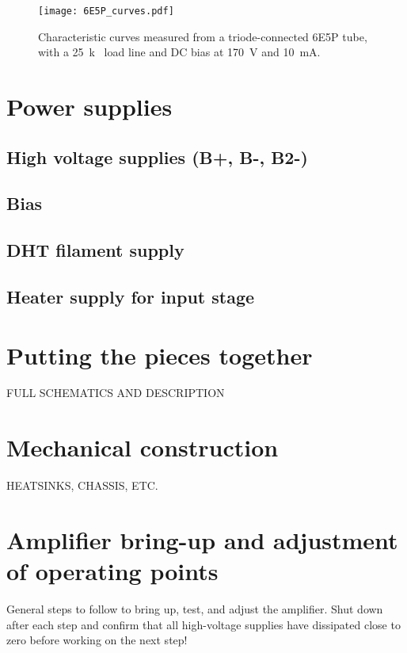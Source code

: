 \begin{figure}
\begin{center}
\texttt{[image: 6E5P\_curves.pdf]}
\caption{Characteristic curves measured from a triode-connected 6E5P tube, with a \SI{25}{k\Ohm} load line and DC bias at \SI{170}{V} and \SI{10}{mA}.}
\end{center}
\end{figure}


\section{Power supplies}

\subsection{High voltage supplies (B+, B-, B2-)}

\subsection{Bias}

\subsection{DHT filament supply}

\subsection{Heater supply for input stage}


\section{Putting the pieces together}

FULL SCHEMATICS AND DESCRIPTION




\section{Mechanical construction}

HEATSINKS, CHASSIS, ETC.


\section{Amplifier bring-up and adjustment of operating points}

General steps to follow to bring up, test, and adjust the amplifier. Shut down after each step and confirm that all high-voltage supplies have dissipated close to zero before working on the next step!

